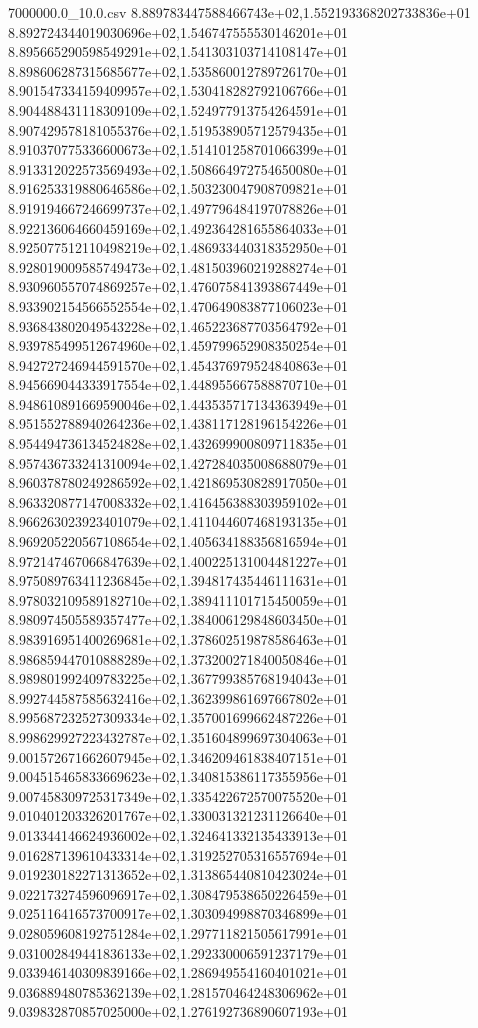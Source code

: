 \begin{filecontents*}{7000000.0_10.0.csv}
8.889783447588466743e+02,1.552193368202733836e+01
8.892724344019030696e+02,1.546747555530146201e+01
8.895665290598549291e+02,1.541303103714108147e+01
8.898606287315685677e+02,1.535860012789726170e+01
8.901547334159409957e+02,1.530418282792106766e+01
8.904488431118309109e+02,1.524977913754264591e+01
8.907429578181055376e+02,1.519538905712579435e+01
8.910370775336600673e+02,1.514101258701066399e+01
8.913312022573569493e+02,1.508664972754650080e+01
8.916253319880646586e+02,1.503230047908709821e+01
8.919194667246699737e+02,1.497796484197078826e+01
8.922136064660459169e+02,1.492364281655864033e+01
8.925077512110498219e+02,1.486933440318352950e+01
8.928019009585749473e+02,1.481503960219288274e+01
8.930960557074869257e+02,1.476075841393867449e+01
8.933902154566552554e+02,1.470649083877106023e+01
8.936843802049543228e+02,1.465223687703564792e+01
8.939785499512674960e+02,1.459799652908350254e+01
8.942727246944591570e+02,1.454376979524840863e+01
8.945669044333917554e+02,1.448955667588870710e+01
8.948610891669590046e+02,1.443535717134363949e+01
8.951552788940264236e+02,1.438117128196154226e+01
8.954494736134524828e+02,1.432699900809711835e+01
8.957436733241310094e+02,1.427284035008688079e+01
8.960378780249286592e+02,1.421869530828917050e+01
8.963320877147008332e+02,1.416456388303959102e+01
8.966263023923401079e+02,1.411044607468193135e+01
8.969205220567108654e+02,1.405634188356816594e+01
8.972147467066847639e+02,1.400225131004481227e+01
8.975089763411236845e+02,1.394817435446111631e+01
8.978032109589182710e+02,1.389411101715450059e+01
8.980974505589357477e+02,1.384006129848603450e+01
8.983916951400269681e+02,1.378602519878586463e+01
8.986859447010888289e+02,1.373200271840050846e+01
8.989801992409783225e+02,1.367799385768194043e+01
8.992744587585632416e+02,1.362399861697667802e+01
8.995687232527309334e+02,1.357001699662487226e+01
8.998629927223432787e+02,1.351604899697304063e+01
9.001572671662607945e+02,1.346209461838407151e+01
9.004515465833669623e+02,1.340815386117355956e+01
9.007458309725317349e+02,1.335422672570075520e+01
9.010401203326201767e+02,1.330031321231126640e+01
9.013344146624936002e+02,1.324641332135433913e+01
9.016287139610433314e+02,1.319252705316557694e+01
9.019230182271313652e+02,1.313865440810423024e+01
9.022173274596096917e+02,1.308479538650226459e+01
9.025116416573700917e+02,1.303094998870346899e+01
9.028059608192751284e+02,1.297711821505617991e+01
9.031002849441836133e+02,1.292330006591237179e+01
9.033946140309839166e+02,1.286949554160401021e+01
9.036889480785362139e+02,1.281570464248306962e+01
9.039832870857025000e+02,1.276192736890607193e+01

\end{filecontents*}
